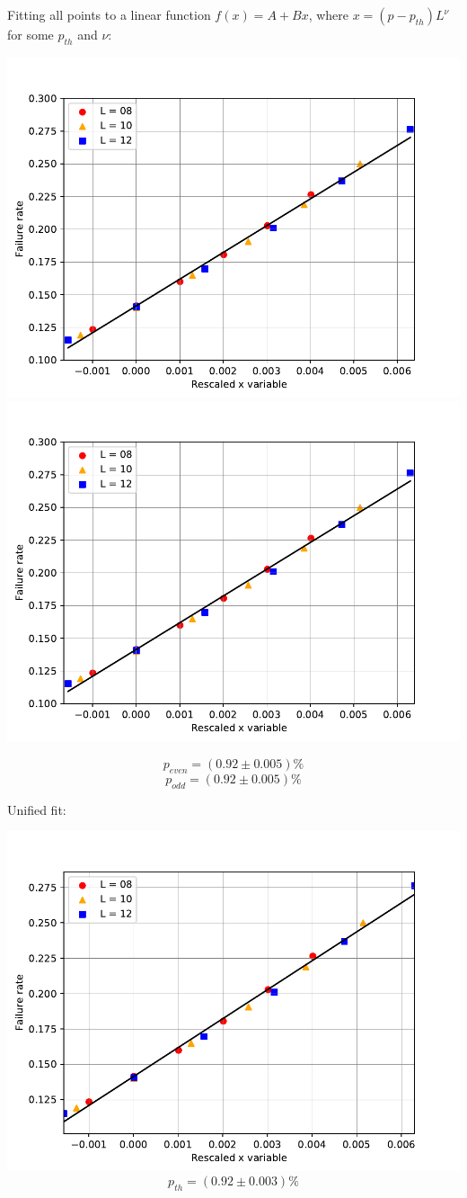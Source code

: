 \documentclass[pra]{revtex4-1}
\begin{document}
\noindent Fitting all points to a linear function $f(x) = A + Bx$, where $x=(p-p_{th})L^{\nu}$ for some $p_{th}$ and $\nu$: 
  
\includegraphics[width=.49\textwidth]{../graphs-paper2/bbr-dephasing-even-rescaled.pdf}
\includegraphics[width=.49\textwidth]{../graphs-paper2/bbr-dephasing-odd-rescaled.pdf}

\[  p_{even} = (0.92 \pm 0.005)\% \]
\[  p_{odd} = (0.92 \pm 0.005)\% \]
\clearpage 

Unified fit: \begin{center} 

\includegraphics[width=.9\textwidth]{../graphs-paper2/bbr-dephasing-rescaled.pdf}
\[  p_{th} = (0.92 \pm 0.003)\% \] \end{center}
\clearpage 
\end{document}
